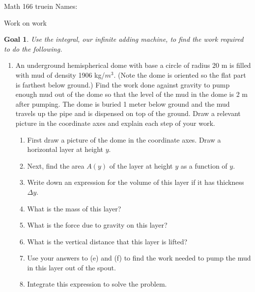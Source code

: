\documentclass[12pt]{article}
\newtheorem*{goal}{Goal}
\begin{document}
\pagestyle{empty} %

\noindent
{Math 166  truein  Names:\ \hrulefill}

\noindent
{Work on work}

\begin{goal} \rm
Use the integral, our infinite adding machine, to find the work required to do the following.
\end{goal}


\begin{enumerate}

\item An underground hemispherical dome with base a circle of radius 20 m is filled with mud of density 1906 kg/$m^3$. (Note the dome  is oriented so the flat part is farthest below ground.) Find the work done against gravity to pump enough mud out of the dome so that the level of the mud in the dome is 2 m after pumping. The dome is buried 1 meter below ground and the mud travels up the pipe and is dispensed on top of the ground. Draw a relevant picture in the coordinate axes and explain each step of your work.

\begin{enumerate}
\item First draw a picture of the dome in the coordinate axes. 
Draw a horizontal layer at height $y$.
\vfill\vfill
\item Next, find the area $A(y)$ of the layer at height $y$ as a function of $y$.
\vfill
\item Write down an expression for the volume of this layer if it has thickness $\Delta y$.
\vfill
\item What is the mass of this layer?
\vfill

\item What is the force due to gravity on this layer? 
\vfill
\item What is the vertical distance that this layer is lifted?
\vfill
\item Use your answers to (e) and (f) to find the work needed to pump the mud in this layer out of the spout.
\vfill
\item Integrate this expression to solve the problem.
\vfill
\end{enumerate}


\end{enumerate}
\end{document}
